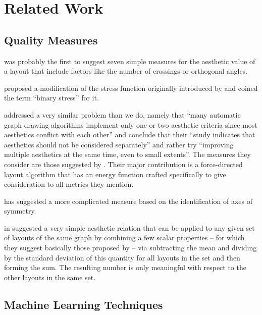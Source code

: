 \documentclass{graphstudy}
\begin{document}
\chapter{Related Work}
\label{chap:relwork}

\section{Quality Measures}

\textcite{Purchase2002} was probably the first to suggest seven simple measures for the aesthetic value of a layout that
include factors like the number of crossings or orthogonal angles.

\textcite{Koren2008} proposed a modification of the stress function originally introduced by \textcite{Kamada1989} and
coined the term \enquote{binary stress} for it.

\textcite{Huang2013} addressed a very similar problem than we do, namely that \enquote{many automatic graph drawing
  algorithms implement only one or two aesthetic criteria since most aesthetics conflict with each other} and conclude
that their \enquote{study indicates that aesthetics should not be considered separately} and rather try
\enquote{improving multiple aesthetics at the same time, even to small extents}.  The measures they consider are those
suggested by \citeauthor{Purchase2002}.  Their major contribution is a force-directed layout algorithm that has an
energy function crafted specifically to give consideration to all metrics they mention.

\textcite{Klapaukh2014} has suggested a more complicated measure based on the identification of axes of symmetry.

\textcite{Huang2016} in \citeyear{Huang2016} suggested a very simple aesthetic relation that can be applied to any given
set of layouts of the same graph by combining a few scalar properties -- for which they suggest basically those proposed
by \citeauthor{Purchase2002} -- via subtracting the mean and dividing by the standard deviation of this quantity for all
layouts in the set and then forming the sum.  The resulting number is only meaningful with respect to the other layouts
in the same set.

\section{Machine Learning Techniques}
\end{document}
